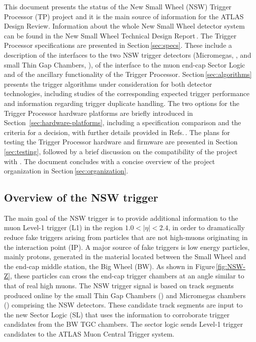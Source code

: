 
This document presents the status of the New Small Wheel (NSW) Trigger Processor (TP) project and it is the main source of information for the ATLAS Design Review.
Information about the whole New Small Wheel detector system can be found in the New Small Wheel Technical Design Report\,\cite{NSWTDR}.
The Trigger Processor specifications are presented in Section\,\ref{sec:specs}.
These include a description of the interfaces to the two NSW trigger detectors (Micromegas, \MM, and small Thin Gap Chambers, \stgc),
of the interface to the muon end-cap Sector Logic and of the ancillary functionality of the Trigger Processor.
Section\,\ref{sec:algorithms} presents the trigger algorithms under consideration for both detector technologies,
including studies of the corresponding expected trigger performance and information regarding trigger duplicate handling.
The two options for the Trigger Processor hardware platforms are briefly introduced in Section~\ref{sec:hardware-platforms}, including a specification comparison and the criteria for a decision, with
further details provided in Refs.\,\cite{hardware-LAr-Carrier,hardware-LAr-OTC,hardware-SRS-Carrier,hardware-SRS-Mezz}.
The plans for testing the Trigger Processor hardware and firmware are presented in Section\,\ref{sec:testing},
followed by a brief discussion on the compatibility of the project with \PhaseTwo.
The document concludes with a concise overview of the project organization in Section\,\ref{sec:organization}.

\subsection{Overview of the NSW trigger}
\label{sec:Overview}

The main goal of the NSW trigger is to provide additional information to the muon Level-1 trigger (L1) in the \endcap region $1.0<|\eta|<2.4$, in order to dramatically reduce fake triggers arising from particles that are not high-\pt muons originating in the interaction point (IP).
A major source of fake triggers is low energy particles, mainly protons, generated in the material located between the Small Wheel and the end-cap middle station, the Big Wheel (BW).
As shown in Figure\,\ref{fig:NSW-Z}, these particles can cross the end-cap trigger chambers at an angle similar to that of real high \pt muons.
The NSW trigger signal is based on track segments produced online by the small Thin Gap Chambers (\stgc) and Micromegas chambers (\MM) comprising the NSW detectors.
These candidate track segments are input to the new Sector Logic (SL) that uses the information to corroborate trigger candidates from the BW TGC chambers.
The sector logic sends Level-1 trigger candidates to the ATLAS Muon Central Trigger system.

